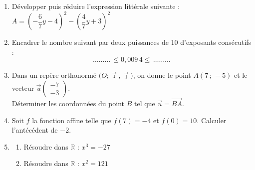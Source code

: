 \documentclass[a4paper,11pt]{article}
\begin{document}
\begin{seanceD}{} %

\begin{enumerate}
\item Développer puis réduire l'expression littérale suivante :\\
 $A=\left(-\dfrac{6}{7}y-4\right)^2-\left(\dfrac{4}{7}y+3\right)^2$ \dotfill

\bigskip

\dotfill

\bigskip

\item Encadrer le nombre suivant par deux puissances de 10 d'exposants consécutifs : 
 $$\dots\dots\dots\,\leqslant 0{,}009\,4\leqslant\,\dots\dots\dots$$


\item   Dans un repère orthonormé $\big(O ; \vec \imath,\vec \jmath\big)$, on donne le point $A(7\,;\,-5)$ et le vecteur $\vec{u}\begin{pmatrix}-7\\-3\end{pmatrix}$.\\Déterminer les coordonnées du point $B$ tel que $\overrightarrow{u}=\overrightarrow{BA}$.\dotfill

\bigskip

\dotfill

\bigskip

\dotfill

\item  Soit $f$ la fonction affine telle que $f(7)=-4$ et $f(0)=10$. Calculer l'antécédent de $-2$. \\

\dotfill

\dotfill


\item \begin{enumerate}[itemsep=1em]
	\item Résoudre dans $\mathbb{R}$ : $x^3=-27$ \dotfill
	\item Résoudre dans $\mathbb{R}$ : $x^2=121$ \dotfill
\end{enumerate}



\end{enumerate}

\end{seanceD}
\end{document}
